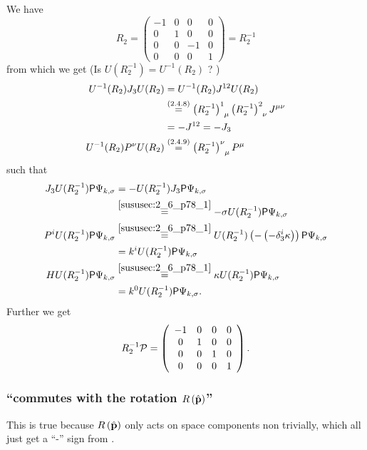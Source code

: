 \subsubsection{ }\label{sususec:2_6_p79_3}
We have \[R_2 = \left(
\begin{array}{cccc}
	-1 & 0 & 0 & 0 \\
	0 & 1 & 0 & 0 \\
	0 & 0 & -1 & 0 \\
	0 & 0 & 0 & 1
\end{array}
\right)=R_2^{-1}\]
from which we get (Is $U(R_2^{-1})=U^{-1}(R_2)$ ? \todo)
\begin{align*} 
	U^{-1}(R_2)J_3U(R_2)&=U^{-1}(R_2)J^{12}U(R_2)\\
	&\overset{({2.4.8})}{=}\left(R_2^{-1}\right)^1_{\hphantom{1}\mu}\left(R_2^{-1}\right)^2_{\hphantom{2}\nu} J^{\mu\nu}\\
	&=- J^{12}=-J_3\\
	U^{-1}(R_2)P^\nu U(R_2)&\overset{({2.4.9})}{=}\left(R_2^{-1}\right)^\nu_{\hphantom{\nu}\mu}P^\mu
\end{align*}
such that
\begin{align*} 
	J_3 U(R_2^{-1}) \mathsf{P} \Psi_{k,\sigma}&= -U(R_2^{-1})J_3 \mathsf{P} \Psi_{k,\sigma}\\
	&\overset{\ref{sususec:2_6_p78_1}}{=}-\sigma U(R_2^{-1})\mathsf{P} \Psi_{k,\sigma}\\
	P^i U(R_2^{-1}) \mathsf{P} \Psi_{k,\sigma}&\overset{\ref{sususec:2_6_p78_1}}{=}U(R_2^{-1}) \left(-\left(-\delta^i_3\kappa\right)\right) \mathsf{P} \Psi_{k,\sigma}\\
	&=k^iU(R_2^{-1}) \mathsf{P} \Psi_{k,\sigma}\\
	H U(R_2^{-1}) \mathsf{P} \Psi_{k,\sigma}&\overset{\ref{sususec:2_6_p78_1}}{=} \kappa U(R_2^{-1}) \mathsf{P} \Psi_{k,\sigma}\\
	&=k^0U(R_2^{-1}) \mathsf{P} \Psi_{k,\sigma}.
\end{align*}
Further we get
\[R_2^{-1}\mathcal{\mathcal{P}}=\left(
\begin{array}{cccc}
	-1 & 0 & 0 & 0 \\
	0 & 1 & 0 & 0 \\
	0 & 0 & 1 & 0 \\
	0 & 0 & 0 & 1
\end{array}
\right).\]

\subsubsection{\enquote{\paritymatrix commutes with the rotation $R\left(\hat{\mathbf{p}}\right)$} }
This is true because $R\left(\hat{\mathbf{p}}\right)$ only acts on space components non trivially, which all just get a \enquote{-} sign from \paritymatrix.

